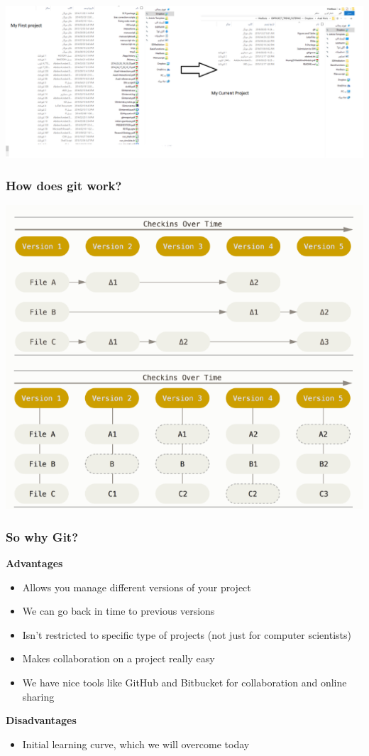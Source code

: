 \documentclass{beamer}
\begin{document}
\begin{frame}
\centering
\includegraphics[scale = 0.25]{history}
\end{frame}


\begin{frame}
\frametitle{How does git work?}
\centering
\includegraphics[scale = 0.5]{workflow}
\end{frame}

\begin{frame}
\frametitle{So why Git?}
\textbf{Advantages}
\begin{itemize}
\item Allows you manage different versions of your project
\item We can go back in time to previous versions 
\item Isn't restricted to specific type of projects (not just for computer scientists)
\item Makes collaboration on a project really easy
\item We have nice tools like GitHub and Bitbucket for collaboration and online sharing
\end{itemize}

\textbf{Disadvantages}
\begin{itemize}
\item Initial learning curve, which we will overcome today
\end{itemize}
\end{frame}
\end{document}
